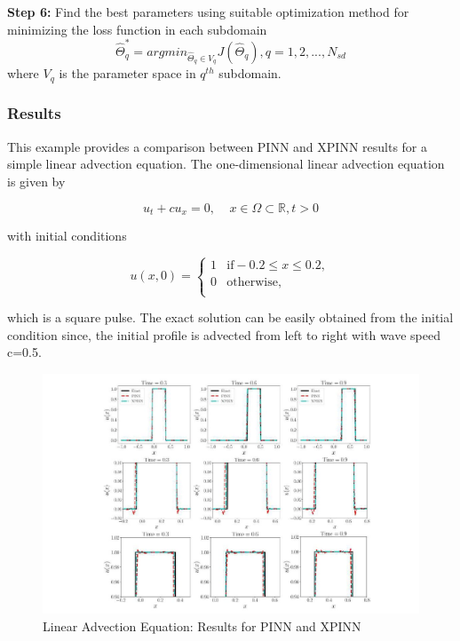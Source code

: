 \documentclass[conference,compsoc]{IEEEtran}
\begin{document}
\textbf{Step 6:} Find the best parameters using suitable optimization method for
minimizing the loss function in each subdomain
\begin{equation}
    \hat{\Theta}_q^* = arg min_{\hat{\Theta}_q \in V_q}J(\hat{\Theta}_q), q=1,2,...,N_{sd}
\end{equation}
where $V_q$ is the parameter space in $q^{th}$ subdomain.


\subsubsection{Results}
This example provides a comparison between PINN and XPINN results for a simple
linear advection equation. The one-dimensional linear advection equation is given by

\begin{equation}
    u_t+cu_x = 0, \;\;\;\; x\in\Omega \subset \mathbb{R},t>0
\end{equation}

with initial conditions

\begin{equation}
    u(x,0) = 
    \begin{cases} 
      1 & \textrm{if}-0.2\leq x \leq 0.2, \\
      0 & \textrm{otherwise},  \\
   \end{cases}
\end{equation}

which is a square pulse. The exact solution can be easily obtained from the initial condition since, the initial profile is advected from left to right with wave speed c=0.5\cite{jagtap2020extended}.

\begin{figure}
    \centering
    \includegraphics[scale=0.7]{figures/xpinn_result.JPG}
    \caption{Linear Advection Equation: Results for PINN and XPINN\cite{jagtap2020extended}}
\end{figure}
\end{document}
